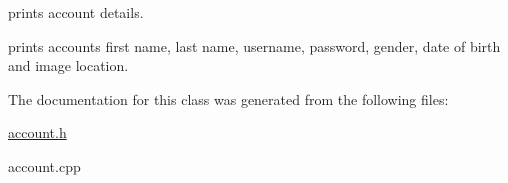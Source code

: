 prints account details. 

prints account\textquotesingle{}s first name, last name, username, password, gender, date of birth and image location. 

The documentation for this class was generated from the following files\+:\begin{DoxyCompactItemize}
\item 
\hyperlink{account_8h}{account.\+h}\item 
account.\+cpp\end{DoxyCompactItemize}
